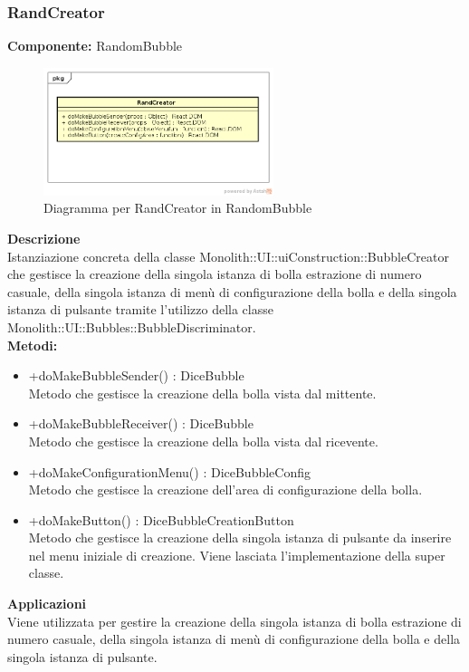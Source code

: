 \subsubsection{RandCreator}
\textbf{Componente:}  RandomBubble\\
   \FloatBarrier
   \begin{figure}[ht]
   \centering
   \includegraphics[width=0.6\textwidth]{img/single-RandCreator.png}
   \caption{{Diagramma per RandCreator in RandomBubble}}
\end{figure}
\FloatBarrier
\textbf{Descrizione}\\
Istanziazione concreta della classe Monolith::UI::uiConstruction::BubbleCreator che gestisce la creazione della singola istanza di bolla estrazione di numero casuale, della singola istanza di menù di configurazione della bolla e della singola istanza di pulsante tramite l'utilizzo della classe Monolith::UI::Bubbles::BubbleDiscriminator.
\\
\textbf{Metodi:} 
\begin{itemize}
\item +doMakeBubbleSender() : DiceBubble 
\\
Metodo che gestisce la creazione della bolla vista dal mittente.
\item +doMakeBubbleReceiver() : DiceBubble 
\\
Metodo che gestisce la creazione della bolla vista dal ricevente.
\item +doMakeConfigurationMenu() : DiceBubbleConfig 
\\
Metodo che gestisce la creazione dell'area di configurazione della bolla.
\item +doMakeButton() : DiceBubbleCreationButton 
\\
Metodo che gestisce la creazione della singola istanza di pulsante da inserire nel menu iniziale di creazione. Viene lasciata l'implementazione della super classe.
\end{itemize} 


\textbf{Applicazioni}\\
Viene utilizzata per gestire la creazione della singola istanza di bolla estrazione di numero casuale, della singola istanza di menù di configurazione della bolla e della singola istanza di pulsante. 



